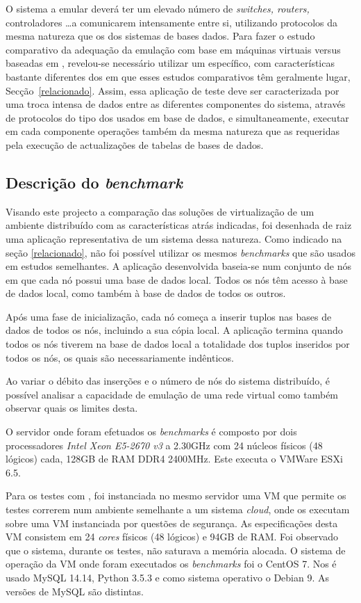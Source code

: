 O sistema a emular deverá ter um elevado número de  \emph{switches, routers,} controladores \dots a
comunicarem intensamente entre si, utilizando protocolos da mesma natureza que os dos sistemas de
bases dados. Para fazer o estudo comparativo da adequação da emulação com base em máquinas
virtuais versus baseadas em {\conts}, revelou-se necessário utilizar um {\bench}
específico, com características bastante diferentes dos em que esses estudos comparativos têm geralmente lugar, \cf Secção~\ref{relacionado}.
Assim, essa aplicação de teste deve ser caracterizada por uma troca intensa de dados entre as diferentes
componentes do sistema, através de protocolos do tipo dos usados em base de dados, e
simultaneamente, executar em cada componente operações também da mesma natureza que as
requeridas pela execução de actualizações de tabelas de bases de dados.

\subsection{Descrição do \textit{benchmark}}

Visando este projecto a comparação das soluções de virtualização de um ambiente distribuído com as características atrás indicadas, foi desenhada de raiz uma aplicação representativa de um sistema dessa natureza. Como indicado na seção \ref{relacionado}, não foi possível utilizar os mesmos {\textit{benchmarks}} que são usados em estudos semelhantes. A aplicação desenvolvida baseia-se num conjunto de nós em que cada nó possui uma base de dados local. Todos os nós têm acesso à base de dados local, como também à base de dados de todos os outros.

Após uma fase de inicialização, cada nó começa a inserir tuplos nas bases de dados de todos os nós, incluindo a sua cópia local. A aplicação termina quando todos os nós tiverem na base de dados local a totalidade dos tuplos inseridos por todos os nós, os quais são necessariamente indênticos.

Ao variar o débito das inserções e o número de nós do sistema distribuído, é possível analisar a capacidade de emulação de uma rede virtual como também observar quais os limites desta.

O servidor onde foram efetuados os \textit{benchmarks} é composto por dois processadores \textit{Intel Xeon E5-2670 v3} a 2.30GHz com 24 núcleos físicos (48 lógicos) cada, 128GB de RAM DDR4 2400MHz. Este executa o {\hiper} VMWare ESXi 6.5.

Para os testes com {\conts}, foi instanciada no mesmo servidor uma VM que permite os testes correrem num ambiente semelhante a um sistema \textit{cloud}, onde os {\conts} executam sobre uma VM instanciada por questões de segurança. As especificações desta VM consistem em 24 \textit{cores} físicos (48 lógicos) e 94GB de RAM. Foi observado que o sistema, durante os testes, não saturava a memória alocada. O sistema de operação da VM onde foram executados os \textit{benchmarks} foi o CentOS 7. Nos {\conts} é usado MySQL 14.14, Python 3.5.3 e como sistema operativo o Debian 9. As versões de MySQL são distintas.

